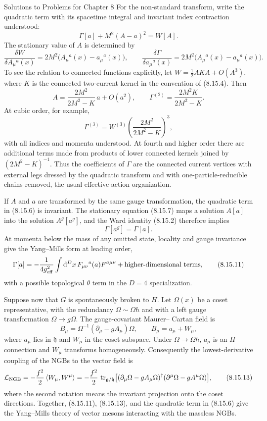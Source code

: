 \begin{bankssolutions}{Solutions to Problems for Chapter 8}
For the non-standard transform, write the quadratic term with its spacetime
integral and invariant index contraction understood:
\[
  \Gamma[a]+M^2(A-a)^2=W[A].
  \tag{8.15.6}
\]
The stationary value of $A$ is determined by
\[
  \frac{\delta W}{\delta A_\mu{}^a(x)}
  =2M^2\bigl(A_\mu{}^a(x)-a_\mu{}^a(x)\bigr),
  \qquad
  \frac{\delta\Gamma}{\delta a_\mu{}^a(x)}
  =2M^2\bigl(A_\mu{}^a(x)-a_\mu{}^a(x)\bigr).
  \tag{8.15.7}
\]
To see the relation to connected functions explicitly, let
$W=\frac12A K A+O(A^3)$, where $K$ is the connected two-current kernel in
the convention of (8.15.4).  Then
\[
  A=\frac{2M^2}{2M^2-K}\,a+O(a^2),
  \qquad
  \Gamma^{(2)}=\frac{2M^2K}{2M^2-K}.
  \tag{8.15.8}
\]
At cubic order, for example,
\[
  \Gamma^{(3)}=W^{(3)}
  \left(\frac{2M^2}{2M^2-K}\right)^3,
  \tag{8.15.9}
\]
with all indices and momenta understood.  At fourth and higher order there
are additional terms made from products of lower connected kernels joined by
$ (2M^2-K)^{-1}$.  Thus the coefficients of $\Gamma$ are the connected
current vertices with external legs dressed by the quadratic transform and
with one-particle-reducible chains removed, the usual effective-action
organization.

If $A$ and $a$ are transformed by the same gauge transformation, the quadratic
term in (8.15.6) is invariant.  The stationary equation (8.15.7) maps a
solution $A[a]$ into the solution $A^g[a^g]$, and the Ward identity (8.15.2)
therefore implies
\[
  \Gamma[a^g]=\Gamma[a].
  \tag{8.15.10}
\]
At momenta below the mass of any omitted state, locality and gauge invariance
give the Yang--Mills form at leading order,
\[
  \Gamma[a]=-\frac1{4g_{\rm eff}^2}\int\mathop{}\!\mathrm{d}^D x\,
  F_{\mu\nu}{}^a(a)F^{a\mu\nu}+\text{higher-dimensional terms},
  \tag{8.15.11}
\]
with a possible topological $\theta$ term in the $D=4$ specialization.

Suppose now that $G$ is spontaneously broken to $H$.  Let $\Omega(x)$ be a
coset representative, with the redundancy $\Omega\sim\Omega h$ and with a
left gauge transformation $\Omega\to g\Omega$.  The gauge-covariant Maurer--
Cartan field is
\[
  B_\mu=\Omega^{-1}(\partial_\mu-gA_\mu)\Omega,
  \qquad B_\mu=a_\mu+W_\mu,
  \tag{8.15.12}
\]
where $a_\mu$ lies in $\mathfrak h$ and $W_\mu$ in the coset subspace.  Under
$\Omega\to\Omega h$, $a_\mu$ is an $H$ connection and $W_\mu$ transforms
homogeneously.  Consequently the lowest-derivative coupling of the NGBs to
the vector field is
\[
  \mathcal L_{\rm NGB}
  =-\frac{f^2}{2}\,\langle W_\mu,W^\mu\rangle
  =-\frac{f^2}{2}\,\operatorname{tr}_{\mathfrak g/\mathfrak h}
  \bigl[(\partial_\mu\Omega-gA_\mu\Omega)^\dagger
  (\partial^\mu\Omega-gA^\mu\Omega)\bigr],
  \tag{8.15.13}
\]
where the second notation means the invariant projection onto the coset
directions.  Together, (8.15.11), (8.15.13), and the quadratic term in
(8.15.6) give the Yang--Mills theory of vector mesons interacting with the
massless NGBs.


\end{bankssolutions}
